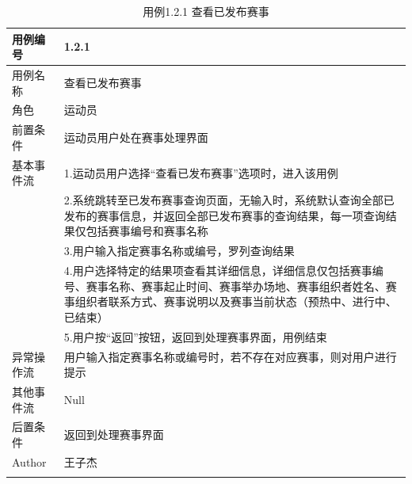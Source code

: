 \documentclass[a4paper,UTF8]{article}
\begin{document}
\begin{table}[H]
\begin{center}
	\caption{用例1.2.1 查看已发布赛事}
	\label{table:Tab_uc121}
	\begin{tabular}{|p{}|p{}|}
		\hline\noalign{\smallskip}
		用例编号 & 1.2.1\\
		\hline
		用例名称 &  查看已发布赛事\\
		\hline
		角色 & 运动员\\
		\hline
		前置条件 & 运动员用户处在赛事处理界面\\
		\hline
		基本事件流 & 1.运动员用户选择“查看已发布赛事”选项时，进入该用例 \\& 2.系统跳转至已发布赛事查询页面，无输入时，系统默认查询全部已发布的赛事信息，并返回全部已发布赛事的查询结果，每一项查询结果仅包括赛事编号和赛事名称 \\& 3.用户输入指定赛事名称或编号，罗列查询结果 \\& 4.用户选择特定的结果项查看其详细信息，详细信息仅包括赛事编号、赛事名称、赛事起止时间、赛事举办场地、赛事组织者姓名、赛事组织者联系方式、赛事说明以及赛事当前状态（预热中、进行中、已结束）\\& 5.用户按“返回”按钮，返回到处理赛事界面，用例结束\\
		\hline
		异常操作流 & 用户输入指定赛事名称或编号时，若不存在对应赛事，则对用户进行提示 \\
		\hline
		其他事件流 & Null \\
		\hline
		后置条件 & 返回到处理赛事界面\\
		\hline
		Author & 王子杰 \\
		\noalign{\smallskip}
		\hline
		\noalign{\smallskip}
	\end{tabular}
\end{center}
\end{table}
\end{document}
